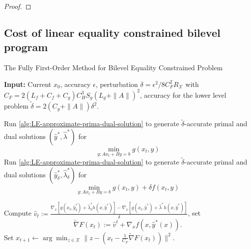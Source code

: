 \begin{proof}
\end{proof}

\subsection{Cost of linear equality constrained bilevel program}\label{sec:LEQ-main-thm-full-proof}

\begin{algorithm}[h]\caption{The Fully First-Order Method for Bilevel Equality Constrained Problem}\label{alg:LE-full-alg}
\begin{algorithmic}[1]
\State \textbf{Input:}
Current $x_0$, accuracy $\epsilon$, perturbation $\delta = \epsilon^2/8C^2_F R_\mathcal{X}$ with $C_F= 2(L_f +C_f+C_g)C_H^3 S_g (L_g +\|A\|)^2$,  accuracy for the lower level problem $\tilde\delta = 2(C_g +\|A\|)\delta^2$.

\State Run \cref{alg:LE-approximate-prima-dual-solution}   to generate $\tilde \delta$-accurate primal and dual solutions $(\hat{y}^*, \hat{\lambda}^*)$ for $$\min_{y: Ax_t+By=b} g(x_t,y)$$
\State  Run \cref{alg:LE-approximate-prima-dual-solution} to generate $\tilde \delta$-accurate primal and dual solutions $(\hat{y}_\delta^*, \hat{\lambda}_\delta^*)$ for 
$$\min_{y: Ax_t+By=b} g(x_t,y)+\delta f(x_t, y)$$ 

\State Compute $\hat{v}_t:= \frac{\nabla_{x}[g(x_t,\hat{y}_\delta^*)+\hat{\lambda}_\delta^* h(x,\hat{y}^*)]-\nabla_{x}[g(x_t,\hat{y}^*)+\hat{\lambda}^* h(x,\hat{y}^*)]}{\delta}$, set $$\widetilde{\nabla} F(x_t) := \hat{v}^t + \nabla_x f(x, \hat{y}^*(x)).$$
\State Set $x_{t+1} \leftarrow \arg\min_{z\in \mathcal{X}} \| z- (x_{t}-\frac{1}{C_F}\widetilde{\nabla} F(x_{t}))\|^2.$
\EndFor

\end{algorithmic}
\end{algorithm}


